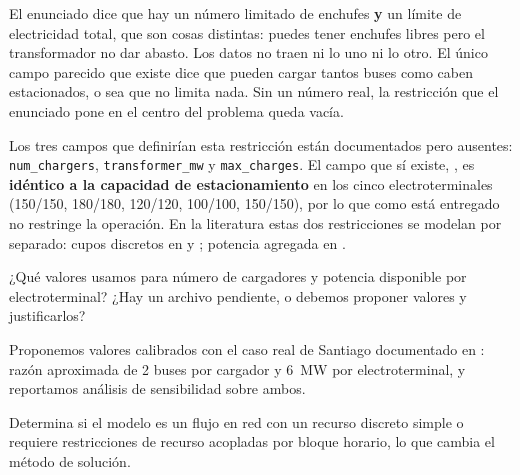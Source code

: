 \documentclass[11pt,a4paper,parskip=half]{scrartcl}
\begin{document}
\begin{campos}
\item[En simple] El enunciado dice que hay un número limitado de enchufes \textbf{y} un límite de electricidad total, que son cosas distintas: puedes tener enchufes libres pero el transformador no dar abasto. Los datos no traen ni lo uno ni lo otro. El único campo parecido que existe dice que pueden cargar tantos buses como caben estacionados, o sea que no limita nada. Sin un número real, la restricción que el enunciado pone en el centro del problema queda vacía.
\item[Evidencia] Los tres campos que definirían esta restricción están documentados pero ausentes: \texttt{num\_chargers}, \texttt{transformer\_mw} y \texttt{max\_charges}. El campo que sí existe, , es \textbf{idéntico a la capacidad de estacionamiento} en los cinco electroterminales (150/150, 180/180, 120/120, 100/100, 150/150), por lo que como está entregado no restringe la operación. En la literatura estas dos restricciones se modelan por separado: cupos discretos en \citet{devos_capacitatedcharging_2024} y \citet{jiang_limitedcapacitylargescale_2022}; potencia agregada en \citet{zapata_gridimpact_2022}.
\item[Pregunta] ¿Qué valores usamos para número de cargadores y potencia disponible por electroterminal? ¿Hay un archivo pendiente, o debemos proponer valores y justificarlos?
\item[Supuesto] Proponemos valores calibrados con el caso real de Santiago documentado en \citet{galarza_pilotstoscale_2020}: razón aproximada de 2 buses por cargador y 6~MW por electroterminal, y reportamos análisis de sensibilidad sobre ambos.
\item[Impacto] Determina si el modelo es un flujo en red con un recurso discreto simple o requiere restricciones de recurso acopladas por bloque horario, lo que cambia el método de solución.
\end{campos}
\end{document}
